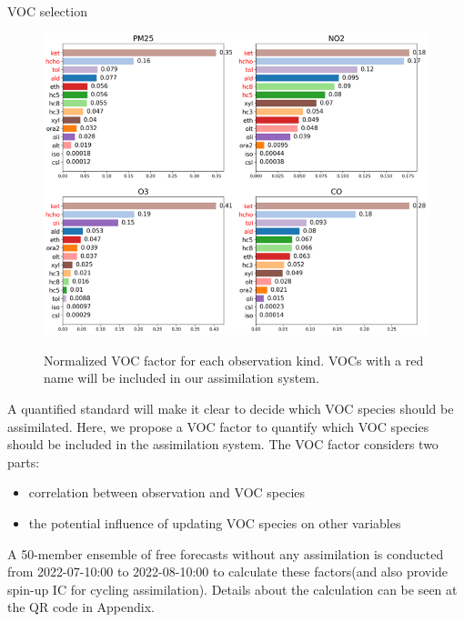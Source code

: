 \documentclass[final]{beamer}
\newlength{\colwidth}
\begin{document}
\begin{frame}[t]
\begin{columns}[t]
\begin{column}{\colwidth}
\begin{block}{VOC selection}
				\begin{figure}
                    {\includegraphics[width=0.6\colwidth,angle=0,scale=1]{figure/VOC_factor_domainavg.png}}
                    \caption{Normalized VOC factor for each observation kind. VOCs with a red name will be included in our assimilation system.}\label{fig_voc_factor}
                \end{figure}
                A quantified standard will make it clear to decide which VOC species should be assimilated. Here, we propose a VOC factor to quantify which VOC species should be included in the assimilation system. The VOC factor considers two parts:
                \begin{itemize}
                    \item correlation between observation and VOC species
                    \item the potential influence of updating VOC species on other variables
                \end{itemize}        
                A 50-member ensemble of free forecasts without any assimilation is conducted from 2022-07-10:00 to 2022-08-10:00 to calculate these factors(and also provide spin-up IC for cycling assimilation). Details about the calculation can be seen at the QR code in Appendix.
			\end{block}
			\begin{block}{}
			    \begin{figure}
                   \begin{minipage}[t]{0.2\colwidth}

\end{minipage}
\end{figure}
\end{block}
\end{column}
\end{columns}
\end{frame}
\end{document}
